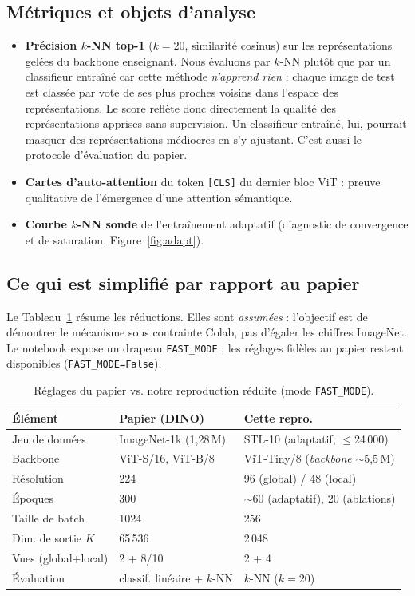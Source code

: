 \documentclass[11pt,a4paper]{article}
\begin{document}
\subsection{Métriques et objets d'analyse}
\begin{itemize}[nosep]
  \item \textbf{Précision $k$-NN top-1} ($k=20$, similarité cosinus) sur les représentations gelées
  du backbone enseignant. Nous évaluons par $k$-NN plutôt que par un classifieur entraîné car cette
  méthode \emph{n'apprend rien} : chaque image de test est classée par vote de ses plus proches
  voisins dans l'espace des représentations. Le score reflète donc directement la qualité des
  représentations apprises sans supervision. Un classifieur entraîné, lui, pourrait masquer des
  représentations médiocres en s'y ajustant. C'est aussi le protocole d'évaluation du papier.
  \item \textbf{Cartes d'auto-attention} du token \texttt{[CLS]} du dernier bloc ViT : preuve
  qualitative de l'émergence d'une attention sémantique.
  \item \textbf{Courbe $k$-NN sonde} de l'entraînement adaptatif (diagnostic de convergence et de
  saturation, Figure~\ref{fig:adapt}).
\end{itemize}

\subsection{Ce qui est simplifié par rapport au papier}
Le Tableau~\ref{tab:simplif} résume les réductions. Elles sont \emph{assumées} : l'objectif est de
démontrer le mécanisme sous contrainte Colab, pas d'égaler les chiffres ImageNet. Le notebook
expose un drapeau \texttt{FAST\_MODE} ; les réglages fidèles au papier restent disponibles
(\texttt{FAST\_MODE=False}).

\begin{table}[h]
\centering
\caption[Réglages : papier vs. reproduction]{Réglages du papier vs. notre reproduction réduite (mode \texttt{FAST\_MODE}).}
\label{tab:simplif}
\begin{tabular}{lll}
\toprule
\textbf{Élément} & \textbf{Papier (DINO)} & \textbf{Cette repro.} \\
\midrule
Jeu de données        & ImageNet-1k (1,28\,M) & STL-10 (adaptatif, $\leq$24\,000) \\
Backbone              & ViT-S/16, ViT-B/8     & ViT-Tiny/8 (\emph{backbone} $\sim$5,5\,M) \\
Résolution            & 224                   & 96 (global) / 48 (local) \\
Époques               & 300                   & $\sim$60 (adaptatif), 20 (ablations) \\
Taille de batch       & 1024                  & 256 \\
Dim. de sortie $K$    & 65\,536               & 2\,048 \\
Vues (global+local)   & 2 + 8/10              & 2 + 4 \\
Évaluation            & classif. linéaire + $k$-NN & $k$-NN ($k{=}20$) \\
\bottomrule
\end{tabular}
\end{table}
\end{document}
